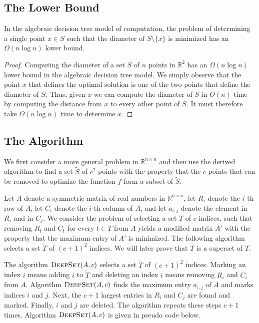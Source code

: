 \documentclass[lotsofwhite]{patmorin}
\begin{document}
\subsection{The Lower Bound}

\begin{thm}
In the algebraic decision tree model of computation, the problem of
determining a single point $x\in S$ such that the diameter of
$S\setminus\{x\}$ is minimized has an $\Omega(n\log n)$ lower bound.
\end{thm}

\begin{proof}
Computing the diameter of a set $S$ of $n$ points in $\mathbb{R}^2$ has 
an $\Omega(n\log n)$ lower bound in the algebraic decision tree model.  
We simply
observe that the point $x$ that defines the optimal solution is one of
the two points that define the diameter of $S$. Thus, given $x$ we can
compute the diameter of $S$ in $O(n)$ time by computing the distance
from $x$ to every other point of $S$.  It must therefore take
$\Omega(n\log n)$ time to determine $x$. 
\end{proof}

\subsection{The Algorithm}

We first consider a more general problem in $\mathbb{R}^{n \times n}$ and then use the derived algorithm to find a set $\tilde{S}$ of $c^2$ points with the property that the $c$ points that can be removed to optimize the function $f$ form a subset of $\tilde{S}$.

Let $A$ denote a symmetric matrix of real numbers in $\mathbb{R}^{n \times n}$, let $R_i$ denote the $i$-th row of $A$, let $C_i$ denote the $i$-th column of $A$, and let $a_{i,j}$ denote the element in $R_i$ and in $C_j$. We consider the problem of selecting a set $T$ of $c$ indices, such that removing $R_t$ and $C_t$ for every $t \in T$ from $A$ yields a modified matrix $A'$ with the property that the maximum entry of $A'$ is minimized. The following algorithm selects a set $\tilde{T}$ of $(c+1)^2$ indices. We will later prove that $\tilde{T}$ is a superset of $T$. 

The algorithm $\textsc{DeepSet}(A,c)$ selects a set $\tilde{T}$ of $(c+1)^2$ indices. Marking an index $i$ means adding $i$ to $\tilde{T}$ and deleting an index $i$ means removing $R_i$ and $C_i$ from $A$. Algorithm $\textsc{DeepSet}(A,c)$ finds the maximum entry $a_{i,j}$ of $A$ and marks indices $i$ and $j$. Next, the $c+1$ largest entries in $R_i$ and $C_j$ are found and marked. Finally, $i$ and $j$ are deleted. The algorithm repeats these steps $c+1$ times. Algorithm $\textsc{DeepSet}(A,c)$ is given in pseudo code below.
\end{document}
